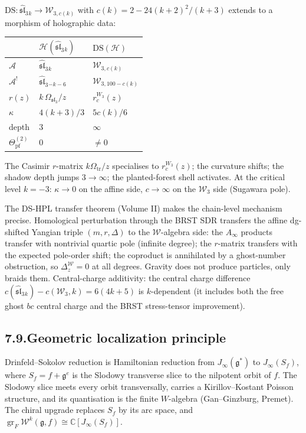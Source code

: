 \documentclass[11pt]{report}
\theoremstyle{definition}
\theoremstyle{remark}
\providecommand{\cA}{\mathcal{A}}
\providecommand{\cH}{\mathcal{H}}
\providecommand{\cW}{\mathcal{W}}
\providecommand{\fg}{\mathfrak{g}}
\providecommand{\fsl}{\mathfrak{sl}}
\providecommand{\bC}{\mathbb{C}}
\DeclareMathOperator{\gr}{gr}
\numberwithin{equation}{section}
\begin{document}
$\mathrm{DS}\colon \widehat{\mathfrak{sl}}_3{}_k \to \cW_{3,c(k)}$
with $c(k) = 2 - 24(k+2)^2/(k+3)$ extends to a morphism of
holographic data:
\begin{center}
\renewcommand{\arraystretch}{1.15}
\begin{tabular}{lll}
& $\cH(\widehat{\mathfrak{sl}}_3{}_k)$
 & $\mathrm{DS}(\cH)$\\
\hline
$\cA$ & $\widehat{\mathfrak{sl}}_3{}_k$ & $\cW_{3,c(k)}$\\
$\cA^!$ & $\widehat{\mathfrak{sl}}_3{}_{-k-6}$ & $\cW_{3,100-c(k)}$\\
$r(z)$ & $k\,\Omega_{\mathfrak{sl}_3}/z$ & $r_c^{W_3}(z)$\\
$\kappa$ & $4(k+3)/3$ & $5c(k)/6$\\
depth & $3$ & $\infty$\\
$\Theta^{(2)}_{\mathrm{pf}}$ & $0$ & $\neq 0$
\end{tabular}
\end{center}
The Casimir $r$-matrix $k\Omega_{\mathrm{tr}}/z$ specialises to
$r_c^{W_3}(z)$; the curvature shifts; the shadow depth jumps
$3 \to \infty$; the planted-forest shell activates. At the
critical level $k = -3$: $\kappa \to 0$ on the affine side,
$c \to \infty$ on the $\cW_3$ side (Sugawara pole).

The DS-HPL transfer theorem (Volume II) makes the chain-level
mechanism precise. Homological perturbation through the BRST
SDR transfers the affine dg-shifted Yangian triple
$(m, r, \Delta)$ to the $\cW$-algebra side: the $A_\infty$
products transfer with nontrivial quartic pole (infinite
degree); the $r$-matrix transfers with the expected pole-order
shift; the coproduct is annihilated by a ghost-number
obstruction, so $\Delta_z^\cW = 0$ at all degrees. Gravity
does not produce particles, only braids them. Central-charge
additivity: the central charge difference
$c(\widehat{\fsl}_3{}_k) - c(\cW_3, k) = 6(4k{+}5)$
is $k$-dependent (it includes both the free ghost $bc$ central charge
and the BRST stress-tensor improvement).

\subsection*{7.9.\quad Geometric localization principle}

Drinfeld--Sokolov reduction is Hamiltonian reduction from
$J_\infty(\fg^*)$ to $J_\infty(S_f)$, where $S_f = f + \fg^e$
is the Slodowy transverse slice to the nilpotent orbit of $f$.
The Slodowy slice meets every orbit transversally, carries a
Kirillov--Kostant Poisson structure, and its quantisation is
the finite $W$-algebra (Gan--Ginzburg, Premet). The chiral
upgrade replaces $S_f$ by its arc space, and
$\gr_F \cW^k(\fg, f) \cong \bC[J_\infty(S_f)]$.
\end{document}
